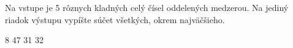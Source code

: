 




Na vstupe je 5 rôznych kladných celý čísel oddelených medzerou. Na jediný riadok výstupu vypíšte súčet všetkých, okrem najväčšieho.

 8 47 31 32 
\koniec


